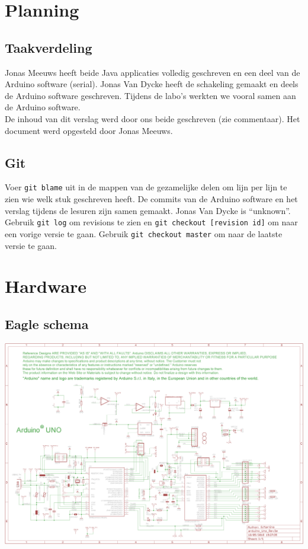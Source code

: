\documentclass[a4paper]{report}
\begin{document}
\chapter{Planning}
\section{Taakverdeling}
Jonas Meeuws heeft beide Java applicaties volledig geschreven en een deel van de Arduino software (serial).
Jonas Van Dycke heeft de schakeling gemaakt en deels de Arduino software geschreven.
Tijdens de labo's werkten we vooral samen aan de Arduino software.\\
De inhoud van dit verslag werd door ons beide geschreven (zie commentaar).
Het document werd opgesteld door Jonas Meeuws.

\section{Git}
Voer \verb!git blame! uit in de mappen van de gezamelijke delen om lijn per lijn te zien wie welk stuk geschreven heeft.
De commits van de Arduino software en het verslag tijdens de lesuren zijn samen gemaakt.
Jonas Van Dycke is ``unknown''.
Gebruik \verb!git log! om revisions te zien en \verb!git checkout [revision id]! om naar een vorige versie te gaan.
Gebruik \verb!git checkout master! om naar de laatste versie te gaan.

\chapter{Hardware}
\section{Eagle schema}
\includegraphics[width=\textwidth]{ArduinoUno_Schema}
\end{document}
